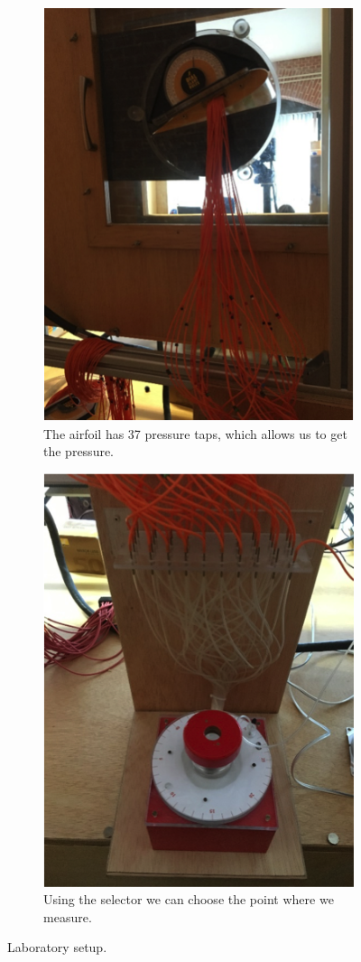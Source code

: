 \documentclass[10pt]{SelfArx} %
\begin{document}
\begin{figure}[!h]
\centering
  \begin{subfigure}[b]{0.2\textwidth}
  \centering
    \includegraphics[scale=0.55]{photos/tunnel_setup_1}
    \caption{The airfoil has 37 pressure taps, which allows us to get the pressure.}
    \label{fig:f1}
  \end{subfigure}
  \hfill
  \begin{subfigure}[b]{0.2\textwidth}
  \centering
    \includegraphics[scale=0.55]{photos/tunnel_setup_2}
    \caption{Using the selector we can choose the point where we measure.}
    \label{fig:f2}
  \end{subfigure}
  \caption{Laboratory setup.}
\end{figure}
\end{document}
